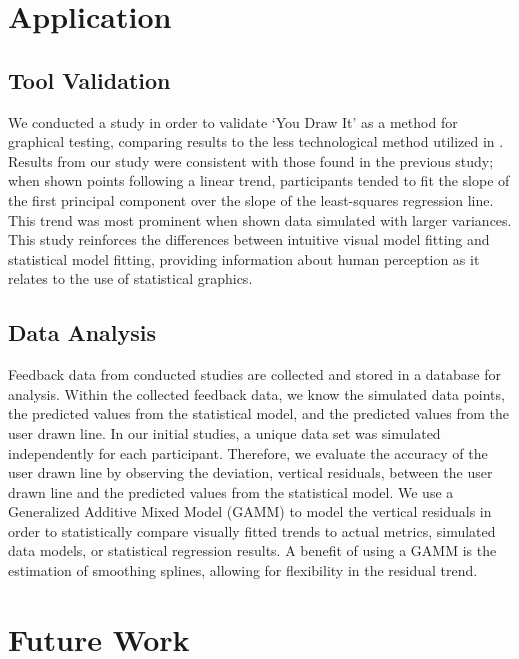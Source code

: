 \documentclass[12pt]{article}
\begin{document}
\hypertarget{application}{%
\section{Application}\label{application}}

\hypertarget{tool-validation}{%
\subsection{Tool Validation}\label{tool-validation}}

We conducted a study in order to validate `You Draw It' as a method for
graphical testing, comparing results to the less technological method
utilized in \citet{mosteller1981eye}. Results from our study were
consistent with those found in the previous study; when shown points
following a linear trend, participants tended to fit the slope of the
first principal component over the slope of the least-squares regression
line. This trend was most prominent when shown data simulated with
larger variances. This study reinforces the differences between
intuitive visual model fitting and statistical model fitting, providing
information about human perception as it relates to the use of
statistical graphics.

\hypertarget{data-analysis}{%
\subsection{Data Analysis}\label{data-analysis}}

Feedback data from conducted studies are collected and stored in a
database for analysis. Within the collected feedback data, we know the
simulated data points, the predicted values from the statistical model,
and the predicted values from the user drawn line. In our initial
studies, a unique data set was simulated independently for each
participant. Therefore, we evaluate the accuracy of the user drawn line
by observing the deviation, vertical residuals, between the user drawn
line and the predicted values from the statistical model. We use a
Generalized Additive Mixed Model (GAMM) to model the vertical residuals
in order to statistically compare visually fitted trends to actual
metrics, simulated data models, or statistical regression results. A
benefit of using a GAMM is the estimation of smoothing splines, allowing
for flexibility in the residual trend.

\hypertarget{future-work}{%
\section{Future Work}\label{future-work}}
\end{document}
